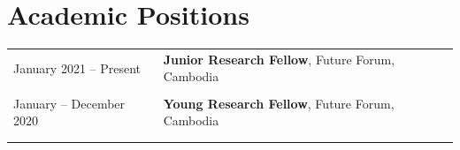 \documentclass[10pt,a4paper]{article}
\begin{document}
	\section*{Academic Positions}
		\noindent \begin{tabular}{@{} l l}
			
			\vspace{-1em}
			\hspace{1em} January 2021 -- Present & \textbf{Junior Research Fellow}, Future Forum, Cambodia \\
			& \\ 
			
			\hspace{1em} January -- December 2020 & \textbf{Young Research Fellow}, Future Forum, Cambodia \\
			& \\ 
			
			\vspace{-1em}
			
				\end{tabular}   

	
\end{document}
